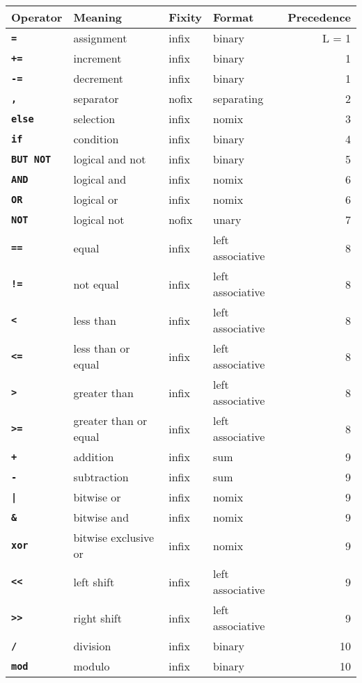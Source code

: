 \documentclass[12pt]{article}
\newcommand{\ttkey}[1]{{\tt \bfseries #1}}
\newlength{\figurewidth}
\newenvironment{boxedfigure}[1][!btp]%
	{\begin{figure*}[#1]
	 \begin{lrbox}{\figurebox}
	 \begin{minipage}{\figurewidth}

	 \vspace*{1ex}}%
	{
	 \vspace*{1ex}

	 \end{minipage}
	 \end{lrbox}

	 \vspace*{-15ex}
	 \centering
	 \fbox{\hspace*{0.1in}\usebox{\figurebox}\hspace*{0.1in}}
	 \end{figure*}}
\begin{document}
\begin{boxedfigure}[!p]
\begin{center}
\begin{tabular}{|llllr|}
\hline
Operator & Meaning & Fixity & Format & Precedence \\
\hline
\ttkey{=} & assignment & infix & binary & L = 1 \\
\ttkey{+=} & increment & infix & binary & 1 \\
\ttkey{-=} & decrement & infix & binary & 1 \\
\hline
\ttkey{,} & separator & nofix & separating & 2 \\
\hline
\ttkey{else} & selection & infix & nomix & 3 \\
\hline
\ttkey{if} & condition & infix & binary & 4 \\
\hline
\ttkey{BUT NOT} & logical and not & infix & binary & 5 \\
\hline
\ttkey{AND} & logical and & infix & nomix & 6 \\
\ttkey{OR} & logical or & infix & nomix & 6 \\
\hline
\ttkey{NOT} & logical not & nofix & unary & 7 \\
\hline
\ttkey{==} & equal & infix & left associative & 8 \\
\ttkey{!=} & not equal & infix & left associative & 8 \\
\ttkey{<} & less than & infix & left associative & 8 \\
\ttkey{<=} & less than or equal & infix & left associative & 8 \\
\ttkey{>} & greater than & infix & left associative & 8 \\
\ttkey{>=} & greater than or equal & infix & left associative & 8 \\
\hline
\ttkey{+} & addition & infix & sum & 9 \\
\ttkey{-} & subtraction & infix & sum & 9 \\
\ttkey{|} & bitwise or & infix & nomix & 9 \\
\ttkey{\&} & bitwise and & infix & nomix & 9 \\
\ttkey{xor} & bitwise exclusive or & infix & nomix & 9 \\
\ttkey{<{}<} & left shift & infix & left associative & 9 \\
\ttkey{>{}>} & right shift & infix & left associative & 9 \\
\hline
\ttkey{/} & division & infix & binary & 10 \\
\ttkey{mod} & modulo & infix & binary & 10 \\

\end{tabular}
\end{center}
\end{boxedfigure}
\end{document}
